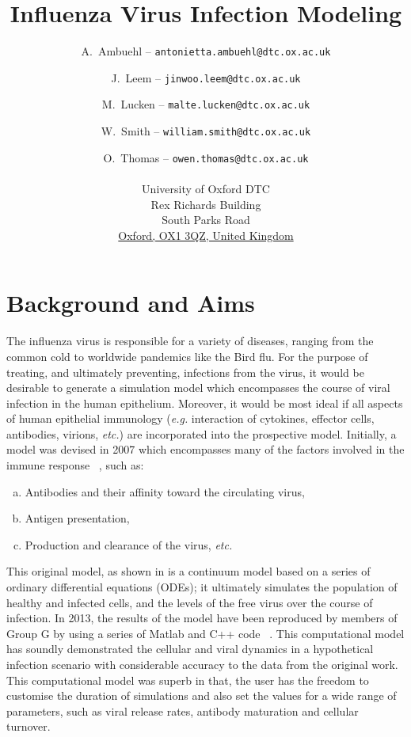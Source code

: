 \documentclass[a4paper, 12pt]{report}
\title{Influenza Virus Infection Modeling}
\author{A.~Ambuehl -- \texttt{antonietta.ambuehl@dtc.ox.ac.uk} \and J.~Leem -- \texttt{jinwoo.leem@dtc.ox.ac.uk} \and M.~Lucken -- \texttt{malte.lucken@dtc.ox.ac.uk} \and W.~Smith -- \texttt{william.smith@dtc.ox.ac.uk} \and O.~Thomas -- \texttt{owen.thomas@dtc.ox.ac.uk} \\\\
University of Oxford DTC \\
Rex Richards Building \\
South Parks Road\\
\underline{Oxford, OX1 3QZ, United Kingdom}\\
}
\begin{document}
\maketitle

%

\chapter{Background and Aims} %

The influenza virus is responsible for a variety of diseases, ranging from the common cold to worldwide pandemics like the Bird flu. For the purpose of treating, and ultimately preventing, infections from the virus, it would be desirable to generate a simulation model which encompasses the course of viral infection in the human epithelium. Moreover, it would be most ideal if all aspects of human epithelial immunology (\emph{e.g.} interaction of cytokines, effector cells, antibodies, virions, \emph{etc.}) are incorporated into the prospective model. Initially, a model was devised in 2007 which encompasses many of the factors involved in the immune response ~\cite{Hancioglu}, such as:
\begin{enumerate}[a.]
\item Antibodies and their affinity toward the circulating virus,
\item Antigen presentation,
\item Production and clearance of the virus, \emph{etc.}
\end{enumerate}


This original model, as shown in %
is a continuum model based on a series of ordinary differential equations (ODEs); it ultimately simulates the population of healthy and infected cells, and the levels of the free virus over the course of infection. 
In 2013, the results of the model have been reproduced by members of Group G by using a series of Matlab and C++ code ~\cite{GroupG}. This computational model has soundly demonstrated the cellular and viral dynamics in a hypothetical infection scenario with considerable accuracy to the data from the original work. This computational model was superb in that, the user has the freedom to customise the duration of simulations and also set the values for a wide range of parameters, such as viral release rates, antibody maturation and cellular turnover. \\
\end{document}
